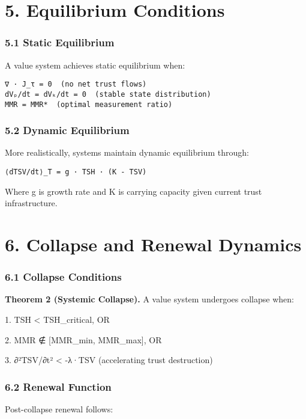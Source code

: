 \documentclass[11pt,oneside]{book}
\begin{document}
\section{5. Equilibrium Conditions}

\subsubsection{5.1 Static Equilibrium}

A value system achieves static equilibrium when:

\begin{verbatim}
∇ · J_τ = 0  (no net trust flows)
dVₚ/dt = dVₖ/dt = 0  (stable state distribution)
MMR = MMR*  (optimal measurement ratio)
\end{verbatim}

\subsubsection{5.2 Dynamic Equilibrium}

More realistically, systems maintain dynamic equilibrium through:

\begin{verbatim}
⟨dTSV/dt⟩_T = g · TSH · (K - TSV)
\end{verbatim}

Where g is growth rate and K is carrying capacity given current trust infrastructure.

\section{6. Collapse and Renewal Dynamics}

\subsubsection{6.1 Collapse Conditions}

\textbf{Theorem 2 (Systemic Collapse).} A value system undergoes collapse when:


1. TSH < TSH\_critical, OR


2. MMR ∉ [MMR\_min, MMR\_max], OR


3. ∂²TSV/∂t² < -λ·TSV (accelerating trust destruction)


\subsubsection{6.2 Renewal Function}

Post-collapse renewal follows:
\end{document}
